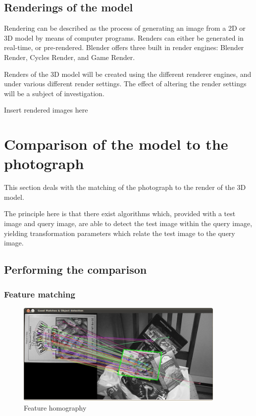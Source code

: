 \documentclass[11pt,a4paper]{report}
\begin{document}
			
		\subsection{Renderings of the model}
			Rendering can be described as the process of generating an image from a 2D or 3D model by means of computer programs. Renders can either be generated in real-time, or pre-rendered. Blender offers three built in render engines: Blender Render, Cycles Render, and Game Render.
			
			Renders of the 3D model will be created using the different renderer engines, and under various different render settings. The effect of altering the render settings will be a subject of investigation.
			
			{{Insert rendered images here}}
			
	\section{Comparison of the model to the photograph}
		This section deals with the matching of the photograph to the render of the 3D model.
		
		The principle here is that there exist algorithms which, provided with a test image and query image, are able to detect the test image within the query image, yielding transformation parameters which relate the test image to the query image.
		
		\subsection{Performing the comparison}
			\subsubsection{Feature matching}
				\begin{figure}[H]
					\centering
					\includegraphics[width=0.9\textwidth]{feature_homography_example}
					\caption{Feature homography}
					\label{fig:feature_homogrophy}
				\end{figure}
				
\end{document}

